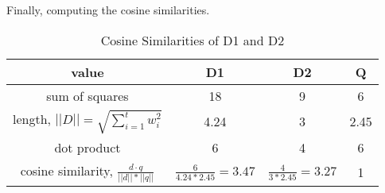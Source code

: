 \documentclass[11pt]{article}
\begin{document}
\begin{enumerate}
        Finally, computing the cosine similarities.
        {\renewcommand{\arraystretch}{3}
        \begin{table}[htbp]
            \begin{center}
                \caption{Cosine Similarities of D1 and D2}
                \begin{tabular}{| c | c | c | c |}
                \hline
                \textbf{value} & \textbf{D1} & \textbf{D2} & \textbf{Q} \\
                \hline
                sum of squares  & 18 & 9 & 6 \\
                \hline
                length, $||D|| = \sqrt{\sum_{i=1}^{t}{w_i^2}}$  & 4.24 & 3 & 2.45 \\
                \hline
                dot product     & 6 & 4 & 6 \\
                \hline
                cosine similarity, $\frac{d \cdot q}{||d||*||q||}$ & $\frac{6}{4.24*2.45}=3.47$ & $\frac{4}{3*2.45}=3.27$ & 1 \\
                \hline
                \end{tabular}
            \end{center}
        \end{table}}

    \end{enumerate}
\end{document}
